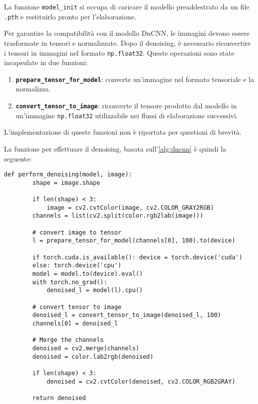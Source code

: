 La funzione \texttt{model\_init} si occupa di caricare il modello preaddestrato da un file \texttt{.pth} e restituirlo pronto per l'elaborazione.

Per garantire la compatibilità con il modello DnCNN, le immagini devono essere trasformate in tensori e normalizzate. Dopo il denoising, è necessario riconvertire i tensori in immagini nel formato \texttt{np.float32}. Queste operazioni sono state incapsulate in due funzioni:

\begin{enumerate}
    \item \textbf{\texttt{prepare\_tensor\_for\_model}}: converte un'immagine nel formato tensoriale e la normalizza.

    \item \textbf{\texttt{convert\_tensor\_to\_image}}: riconverte il tensore prodotto dal modello in un'immagine \texttt{np.float32} utilizzabile nei flussi di elaborazione successivi.
\end{enumerate}

L'implementazione di queste funzioni non è riportata per questioni di brevità.

La funzione per effettuare il denoising, basata sull'\cref{alg:dncnn} è quindi la seguente:

\begin{lstlisting}[label={lst:denoise}]
    def perform_denoising(model, image):
        shape = image.shape

        if len(shape) < 3:
            image = cv2.cvtColor(image, cv2.COLOR_GRAY2RGB)
        channels = list(cv2.split(color.rgb2lab(image)))
        
        # convert image to tensor
        l = prepare_tensor_for_model(channels[0], 100).to(device)
        
        if torch.cuda.is_available(): device = torch.device('cuda')
        else: torch.device('cpu')
        model = model.to(device).eval()
        with torch.no_grad():
            denoised_l = model(l).cpu()

        # convert tensor to image
        denoised_l = convert_tensor_to_image(denoised_l, 100)
        channels[0] = denoised_l

        # Merge the channels
        denoised = cv2.merge(channels)
        denoised = color.lab2rgb(denoised)

        if len(shape) < 3:
            denoised = cv2.cvtColor(denoised, cv2.COLOR_RGB2GRAY)

        return denoised
\end{lstlisting}

